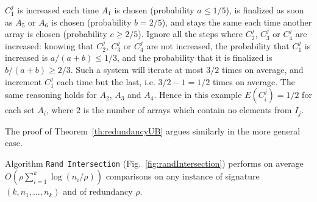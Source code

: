 \begin{example}
  $C_1^j$ is increased each time $A_1$ is chosen (probability $a\leq
  1/5$), is finalized as soon as $A_5$ or $A_6$ is chosen (probability
  $b=2/5$), and stays the same each time another array is chosen
  (probability $c\geq 2/5$).
  Ignore all the steps where $C_2^j$, $C_3^j$ or $C_4^j$ are
  increased:
  knowing that $C_2^j$, $C_3^j$ or $C_4^j$ are not increased, the
  probability that $C_1^j$ is increased is $a/(a+b)\leq 1/3$, and the
  probability that it is finalized is $b/(a+b)\geq 2/3$.
  Such a system will iterate at most $3/2$ times on average, and
  increment $C_1^j$ each time but the last, i.e. $3/2-1=1/2$ times on
  average.
  The same reasoning holds for $A_2$, $A_3$ and $A_4$.
  Hence in this example $E(C_i^j)=1/2$ for each set $A_i$, where $2$
  is the number of arrays which contain no elements from $I_j$.
\end{example}
The proof of Theorem~\ref{th:redundancyUB} argues similarly in the
more general case.



\begin{theorem}\label{th:redundancyUB}
Algorithm {\tt Rand Intersection}
(Fig.~\ref{fig:randIntersection}) performs on average
$O(\rho\sum_{i=1}^k\log(n_i/\rho))$ comparisons on any instance of signature
$(k,n_1,\ldots,n_k)$ and of redundancy $\rho$.
\end{theorem}

